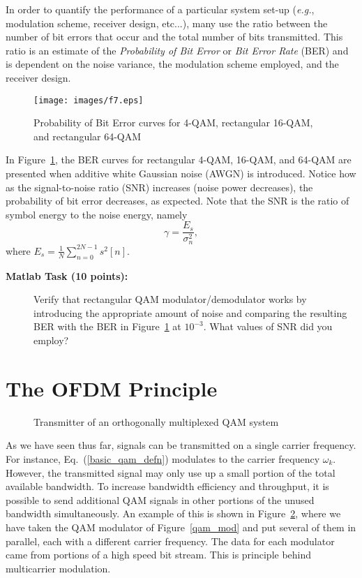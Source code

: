 \documentclass[letterpaper,12pt]{article}
\newcounter{matlabcnt}
\begin{document}
In order to quantify the performance of a particular system set-up
(\textit{e.g.}, modulation scheme, receiver design, etc...), many use the
ratio between the number of bit errors that occur and the total
number of bits transmitted. This ratio is an estimate of the {\it
Probability of Bit Error} or {\it Bit Error Rate} (BER) and is
dependent on the noise variance, the modulation scheme employed,
and the receiver design.
\begin{figure}[t]
  \centering
  \texttt{[image: images/f7.eps]}\\
  \caption{Probability of Bit Error curves for 4-QAM, rectangular 16-QAM, and rectangular 64-QAM}\label{ber_curves}
\end{figure}

In Figure~\ref{ber_curves}, the BER curves for rectangular 4-QAM,
16-QAM, and 64-QAM are presented when additive white Gaussian
noise (AWGN) is introduced. Notice how as the signal-to-noise
ratio (SNR) increases (noise power decreases), the probability of
bit error decreases, as expected. Note that the SNR is the ratio
of symbol energy to the noise energy, namely
\begin{equation}
\gamma=\frac{E_s}{\sigma_n^2},%
\end{equation}where $E_s=\frac{1}{N}\sum_{n=0}^{2N-1} s^2[n]$.

\begin{description}
    \item[{\bf Matlab Task  (10 points):}]
    Verify that rectangular QAM modulator/demodulator works by
    introducing the appropriate amount of noise and comparing the
    resulting BER with the BER in Figure~\ref{ber_curves} at
    $10^{-3}$. What values of SNR did you employ?
\end{description}



\section{The OFDM Principle}
\begin{figure} \centering
\scalebox{.5}{}
\caption{Transmitter of an orthogonally multiplexed QAM
system}\label{oqamsys}
\end{figure}

As we have seen thus far, signals can be transmitted on a single
carrier frequency. For instance, Eq.~(\ref{basic_qam_defn})
modulates to the carrier frequency $\omega_k$. However, the
transmitted signal may only use up a small portion of the total
available bandwidth. To increase bandwidth efficiency and
throughput, it is possible to send additional QAM signals in other portions
of the unused bandwidth simultaneously. An example of this is
shown in Figure~\ref{oqamsys}, where we have taken the QAM
modulator of Figure~\ref{qam_mod} and put several of them in
parallel, each with a different carrier frequency. The data for
each modulator came from portions of a high speed bit stream. This
is principle behind multicarrier modulation.
\end{document}
